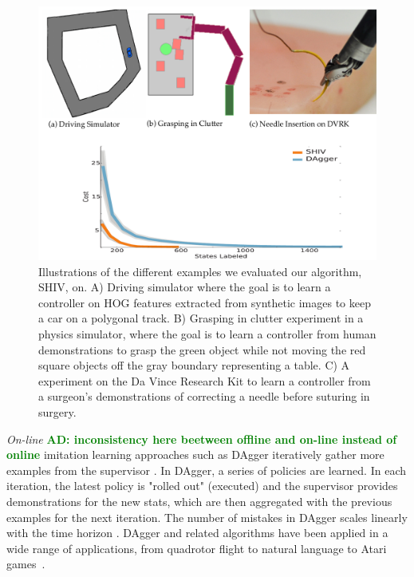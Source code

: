 \documentclass[10pt, conference]{ieeeconf}      %
\newcommand{\adnote}[1]{\ifthenelse{\boolean{include-notes}}%
 {\textcolor{green}{\textbf{AD: #1}}}{}}
\begin{document}
\begin{figure}[t!]
\centering
\includegraphics[width=\columnwidth]{figures/teaser.pdf}
\caption{ 
Illustrations of the different examples we evaluated our algorithm, SHIV, on. A) Driving simulator where the goal is to learn a controller on HOG features extracted from synthetic images to keep a car on a polygonal track. B) Grasping in clutter experiment in a physics simulator, where the goal is to learn a controller from human demonstrations to grasp the green object while not moving the red square objects off the gray boundary representing a table. C) A experiment on the Da Vince Research Kit to learn a controller from a surgeon's demonstrations of correcting a needle before suturing in surgery. 
}
\vspace*{-10pt}
\label{fig:dis_traveled}
\end{figure}

\emph{On-line}\adnote{inconsistency here beetween offline and on-line instead of online} imitation learning approaches such as DAgger iteratively gather more examples from the supervisor \cite{grollman2007dogged,ross2010efficient,ross2010reduction}. In DAgger, a series of policies are learned.  In each iteration, the latest policy is "rolled out" (executed) and the supervisor provides demonstrations for the  new stats, which are then aggregated with the previous examples for the next iteration. The number of mistakes in DAgger scales linearly with the time horizon \cite{ross2010efficient}. DAgger and related algorithms have been applied in a wide range of applications, from quadrotor flight to natural language to Atari games~\cite{NIPS2014_5421,duvallet2013imitation,ross2013learning}.
\end{document}

